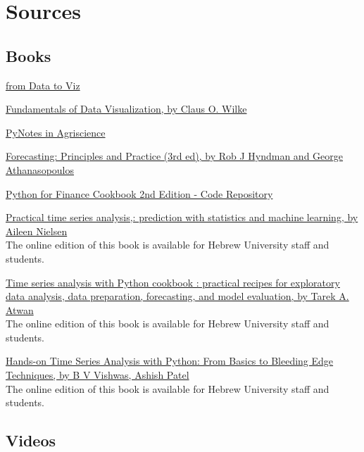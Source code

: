\documentclass[
  letterpaper,
  DIV=11,
  numbers=noendperiod,
  oneside]{scrreprt}
\begin{document}
\hypertarget{sources}{%
\chapter*{Sources}\label{sources}}


\hypertarget{books}{%
\section*{Books}\label{books}}


\href{https://www.data-to-viz.com}{from Data to Viz}

\href{https://clauswilke.com/dataviz/}{Fundamentals of Data
Visualization, by Claus O. Wilke}

\href{https://soilwater.github.io/pynotes-agriscience/intro.html}{PyNotes
in Agriscience}

\href{https://otexts.com/fpp3/}{Forecasting: Principles and Practice
(3rd ed), by Rob J Hyndman and George Athanasopoulos}

\href{https://github.com/erykml/Python-for-Finance-Cookbook-2E}{Python
for Finance Cookbook 2nd Edition - Code Repository}

\href{https://huji.primo.exlibrisgroup.com/permalink/972HUJI_INST/10ptda2/alma9920842016603701}{Practical
time series analysis,: prediction with statistics and machine learning,
by Aileen Nielsen}\\
The online edition of this book is available for Hebrew University staff
and students.

\href{https://huji.primo.exlibrisgroup.com/permalink/972HUJI_INST/10ptda2/alma9921049267803701}{Time
series analysis with Python cookbook : practical recipes for exploratory
data analysis, data preparation, forecasting, and model evaluation, by
Tarek A. Atwan}\\
The online edition of this book is available for Hebrew University staff
and students.

\href{https://huji.primo.exlibrisgroup.com/permalink/972HUJI_INST/10ptda2/alma9920845706703701}{Hands-on
Time Series Analysis with Python: From Basics to Bleeding Edge
Techniques, by B V Vishwas, Ashish Patel}\\
The online edition of this book is available for Hebrew University staff
and students.

\hypertarget{videos}{%
\section*{Videos}\label{videos}}
\end{document}
